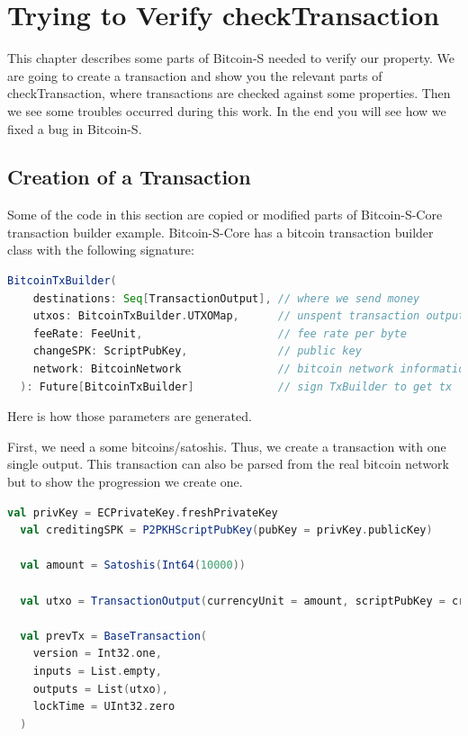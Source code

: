 \chapter{Trying to Verify checkTransaction}
\label{chap:verify_check}

This chapter describes some parts of Bitcoin-S needed to verify our property.
We are going to create a transaction and show you the relevant parts of checkTransaction, where transactions are checked against some properties.
Then we see some troubles occurred during this work.
In the end you will see how we fixed a bug in Bitcoin-S.


\section{Creation of a Transaction}

Some of the code in this section are copied or modified parts of Bitcoin-S-Core transaction builder example.\cite{BitcoinSCore:txbuilderexample}
Bitcoin-S-Core has a bitcoin transaction builder class with the following signature:
\begin{lstlisting}[language=scala]
  BitcoinTxBuilder(
    destinations: Seq[TransactionOutput], // where we send money
    utxos: BitcoinTxBuilder.UTXOMap,      // unspent transaction outputs
    feeRate: FeeUnit,                     // fee rate per byte
    changeSPK: ScriptPubKey,              // public key
    network: BitcoinNetwork               // bitcoin network information
  ): Future[BitcoinTxBuilder]             // sign TxBuilder to get tx
\end{lstlisting}

Here is how those parameters are generated.

First, we need a some bitcoins/satoshis.
Thus, we create a transaction with one single output.
This transaction can also be parsed from the real bitcoin network but to show the progression we create one.
\begin{lstlisting}[language=scala]
  val privKey = ECPrivateKey.freshPrivateKey
  val creditingSPK = P2PKHScriptPubKey(pubKey = privKey.publicKey)

  val amount = Satoshis(Int64(10000))

  val utxo = TransactionOutput(currencyUnit = amount, scriptPubKey = creditingSPK)

  val prevTx = BaseTransaction(
    version = Int32.one,
    inputs = List.empty,
    outputs = List(utxo),
    lockTime = UInt32.zero
  )
\end{lstlisting}

